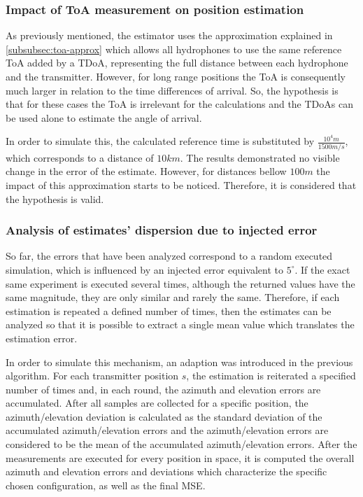 \subsubsection{Impact of ToA measurement on position estimation}

As previously mentioned, the estimator uses the approximation explained in \ref{subsubsec:toa-approx} which allows all hydrophones to use the same reference ToA added by a TDoA, representing the full distance between each hydrophone and the transmitter. However, for long range positions the ToA is consequently much larger in relation to the time differences of arrival. So, the hypothesis is that for these cases the ToA is irrelevant for the calculations and the TDoAs can be used alone to estimate the angle of arrival.

In order to simulate this, the calculated reference time is substituted by $\frac{10^4 m}{1500 m/s}$, which corresponds to a distance of $10 km$. The results demonstrated no visible change in the error of the estimate. However, for distances bellow $100m$ the impact of this approximation starts to be noticed. Therefore, it is considered that the hypothesis is valid. 

\subsubsection{Analysis of estimates' dispersion due to injected error}

So far, the errors that have been analyzed correspond to a random executed simulation, which is influenced by an injected error equivalent to $5^{\circ}$. If the exact same experiment is executed several times, although the returned values have the same magnitude, they are only similar and rarely the same. Therefore, if each estimation is repeated a defined number of times, then the estimates can be analyzed so that it is possible to extract a single mean value which translates the estimation error.

In order to simulate this mechanism, an adaption was introduced in the previous algorithm. For each transmitter position $s$, the estimation is reiterated a specified number of times and, in each round, the azimuth and elevation errors are accumulated. After all samples are collected for a specific position, the azimuth/elevation deviation is calculated as the standard deviation of the accumulated azimuth/elevation errors and the azimuth/elevation errors are considered to be the mean of the accumulated azimuth/elevation errors. After the measurements are executed for every position in space, it is computed the overall azimuth and elevation errors and deviations which characterize the specific chosen configuration, as well as the final MSE.

